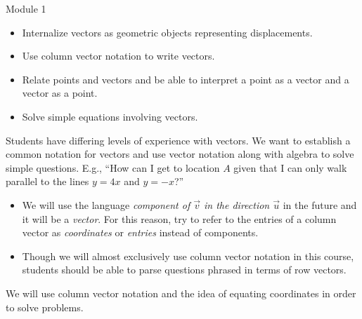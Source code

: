 \documentclass{workbook}
\begin{document}
\begin{lesson}

	Module 1

	\begin{itemize}
		\item Internalize vectors as geometric objects representing displacements.

		\item Use column vector notation to write vectors.

		\item Relate points and vectors and be able to interpret a point as
			a vector and a vector as a point.

		\item Solve simple equations involving vectors.
	\end{itemize}

	 Students have differing levels of experience with vectors.
	We want to establish a common notation for vectors and use vector notation
	along with algebra to solve simple questions. E.g., ``How can I get to location
	$A$ given that I can only walk parallel to the lines $y=4x$ and $y=-x$?''


	\begin{annotation}
		\begin{notes}
			\begin{itemize}
			\item
			We will use the language \emph{component of $\vec v$ in
			the direction $\vec u$} in the future and it will be a \emph{vector}.
			For this reason, try to refer to the entries of a column
			vector as \emph{coordinates} or \emph{entries} instead of components.

			\item
			Though we will almost exclusively use
			column vector notation in this course, students should be able to parse
			questions phrased in terms of row vectors.
			\end{itemize}
		\end{notes}
	\end{annotation}We will use column vector notation and the idea of equating
	coordinates in order to solve problems.

\end{lesson}
\end{document}
